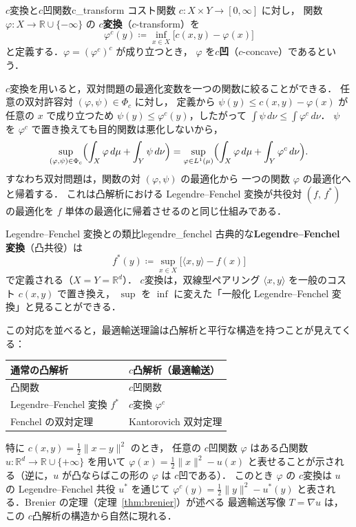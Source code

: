 \documentclass[uplatex, dvipdfmx]{jsarticle}
\begin{document}
\begin{definition}{$c$変換と$c$凹関数}{c_transform}
コスト関数 $c\colon X\times Y\to[0,\infty]$ に対し，
関数 $\varphi\colon X\to\mathbb{R}\cup\{-\infty\}$ の
\textbf{$c$変換}（$c$-transform）を
\[
  \varphi^c(y) \coloneqq \inf_{x\in X}\bigl[c(x,y)-\varphi(x)\bigr]
\]
と定義する．$\varphi = (\varphi^c)^c$ が成り立つとき，
$\varphi$ を\textbf{$c$凹}（$c$-concave）であるという．
\end{definition}

$c$変換を用いると，双対問題の最適化変数を一つの関数に絞ることができる．
任意の双対許容対 $(\varphi,\psi)\in\Phi_c$ に対し，
定義から $\psi(y)\le c(x,y)-\varphi(x)$ が任意の $x$ で成り立つため
$\psi(y)\le\varphi^c(y)$，したがって $\int\psi\,d\nu\le\int\varphi^c\,d\nu$．
$\psi$ を $\varphi^c$ で置き換えても目的関数は悪化しないから，
\[
  \sup_{(\varphi,\psi)\in\Phi_c}
  \Bigl(\int_X\varphi\,d\mu + \int_Y\psi\,d\nu\Bigr)
  = \sup_{\varphi\in L^1(\mu)}
  \Bigl(\int_X\varphi\,d\mu + \int_Y\varphi^c\,d\nu\Bigr).
\]
すなわち双対問題は，関数の対 $(\varphi,\psi)$ の最適化から
一つの関数 $\varphi$ の最適化へと帰着する．
これは凸解析における Legendre--Fenchel 変換が共役対 $(f,\,f^*)$ の最適化を
$f$ 単体の最適化に帰着させるのと同じ仕組みである．

\begin{remark}{Legendre--Fenchel 変換との類比}{legendre_fenchel}
古典的な\textbf{Legendre--Fenchel 変換}（凸共役）は
\[
  f^*(y) \coloneqq \sup_{x\in X}\bigl[\langle x,y\rangle - f(x)\bigr]
\]
で定義される（$X=Y=\mathbb{R}^d$）．
$c$変換は，双線型ペアリング $\langle x,y\rangle$ を一般のコスト $c(x,y)$ で置き換え，
$\sup$ を $\inf$ に変えた「一般化 Legendre--Fenchel 変換」と見ることができる．

この対応を並べると，最適輸送理論は凸解析と平行な構造を持つことが見えてくる：

\medskip
\begin{center}
{\renewcommand{\arraystretch}{1.4}
\begin{tabular}{ll}
  \hline
  \textbf{通常の凸解析} & \textbf{$c$凸解析（最適輸送）} \\
  \hline
  凸関数 & $c$凹関数 \\
  Legendre--Fenchel 変換 $f^*$ & $c$変換 $\varphi^c$ \\
  Fenchel の双対定理 & Kantorovich 双対定理 \\
  \hline
\end{tabular}}
\end{center}
\medskip

特に $c(x,y)=\tfrac{1}{2}\|x-y\|^2$ のとき，
任意の $c$凹関数 $\varphi$ はある凸関数 $u\colon\mathbb{R}^d\to\mathbb{R}\cup\{+\infty\}$ を用いて
$\varphi(x)=\tfrac{1}{2}\|x\|^2-u(x)$
と表せることが示される（逆に，$u$ が凸ならばこの形の $\varphi$ は $c$凹である）．
このとき $\varphi$ の $c$変換は
$u$ の Legendre--Fenchel 共役 $u^*$ を通じて $\varphi^c(y)=\tfrac{1}{2}\|y\|^2-u^*(y)$
と表される．Brenier の定理（定理~\ref{thm:brenier}）が述べる
最適輸送写像 $T=\nabla u$ は，この $c$凸解析の構造から自然に現れる．
\end{remark}
\end{document}
